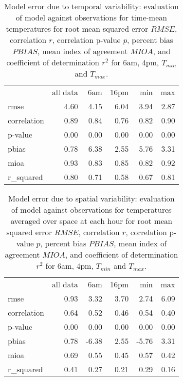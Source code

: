 \begin{table}
\centering
\begin{tabular}{lrrrrr}
{} &  all data &     6am &   16pm &   min &  max \\
rmse        &      4.60 &  4.15 & 6.04 &  3.94 & 2.87 \\
correlation &      0.89 &  0.84 & 0.76 &  0.82 & 0.90 \\
p-value     &      0.00 &  0.00 & 0.00 &  0.00 & 0.00 \\
pbias       &      0.78 & -6.38 & 2.55 & -5.76 & 3.31 \\
mioa        &      0.93 &  0.83 & 0.85 &  0.82 & 0.92 \\
r\_squared   &      0.80 &  0.71 & 0.58 &  0.67 & 0.81 \\
\end{tabular}


\caption{Model error due to temporal variability: evaluation of model against observations for time-mean temperatures for root mean squared error $RMSE$, correlation  $r$, correlation p-value $p$, percent bias $PBIAS$, mean index of agreement $MIOA$, and coefficient of determination $r^2$ for 6am, 4pm, $T_{min}$ and $T_{max}$.  }
\label{tab:time_error}
\end{table}

\begin{table}
\centering
\begin{tabular}{lrrrrr}
{} &  all data &     6am &   16pm &   min &  max \\
rmse        &      0.93 &  3.32 & 3.70 &  2.74 & 6.09 \\
correlation &      0.64 &  0.52 & 0.46 &  0.54 & 0.40 \\
p-value     &      0.00 &  0.00 & 0.00 &  0.00 & 0.00 \\
pbias       &      0.78 & -6.38 & 2.55 & -5.76 & 3.31 \\
mioa        &      0.69 &  0.55 & 0.45 &  0.57 & 0.42 \\
r\_squared   &      0.41 &  0.27 & 0.21 &  0.29 & 0.16 \\
\end{tabular}
\caption{Model error due to spatial variability: evaluation of model against observations for temperatures averaged over space at each hour for root mean squared error $RMSE$, correlation  $r$, correlation p-value $p$, percent bias $PBIAS$, mean index of agreement $MIOA$, and coefficient of determination $r^2$ for 6am, 4pm, $T_{min}$ and $T_{max}$.  }
\label{tab:space_error}
\end{table}


